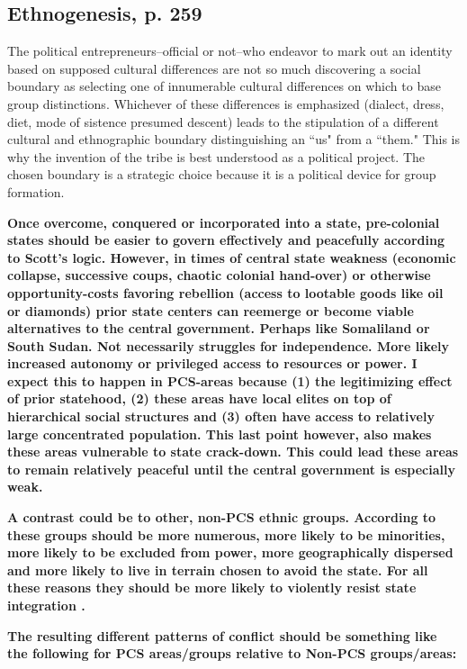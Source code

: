 \documentclass[12pt]{article}
\begin{document}
\subsection{Ethnogenesis, p. 259}

The political entrepreneurs--official or not--who endeavor to mark out an
identity based on supposed cultural differences are not so much discovering a
social boundary as selecting one of innumerable cultural differences on which to
base group distinctions.  Whichever of these differences is emphasized (dialect,
dress, diet, mode of sistence presumed descent) leads to the stipulation
of a different cultural and ethnographic boundary distinguishing an ``us" from
a ``them." This is why the invention of the tribe is best understood as a
political project. The chosen boundary is a strategic choice because it is a
political device for group formation. 

\textbf{Once overcome, conquered or incorporated into a state, pre-colonial
states should be easier to govern effectively and peacefully according to Scott's
logic. However, in times of central state weakness (economic collapse, successive
coups, chaotic colonial hand-over) or otherwise opportunity-costs favoring
rebellion (access to lootable goods like oil or diamonds) prior state centers
can reemerge or become viable alternatives to the central government. Perhaps
like Somaliland or South Sudan. Not necessarily struggles for independence. More
likely increased autonomy or privileged access to resources or power. I expect
this to happen in PCS-areas because (1) the legitimizing effect of prior
statehood, (2) these areas have local elites on top of hierarchical social
structures \citep{Scott2009} and (3) often have access to relatively large
concentrated population. This last point however, also makes these areas
vulnerable to state crack-down. This could lead these areas to remain relatively
peaceful until the central government is especially weak.}

\textbf{A contrast could be to other, non-PCS ethnic groups. According to
\citet{Scott2009} these groups should be more numerous, more likely to be
minorities, more likely to be excluded from power, more geographically
dispersed and more likely to live in terrain chosen to avoid the state. For all
these reasons they should be more likely to violently resist state integration
\citep{Ying_2020, Scott2009}.}

\textbf{The resulting different patterns of conflict should be something like the
following for PCS areas/groups relative to Non-PCS groups/areas:}
\end{document}

